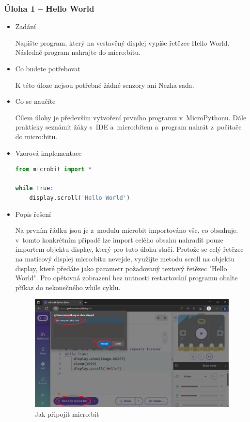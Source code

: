 \documentclass[
  digital,     %
  oneside,     %
  nosansbold,  %
  colorbold, %
  lof,         %
  nolot,         %
]{fithesis4}
\begin{document}
\subsubsection{Úloha 1 -- Hello World}
\begin{itemize}
    \item Zadání

Napište program, který na vestavěný displej vypíše řetězec Hello World. Následně program nahrajte do micro:bitu.
    \item Co budete potřebovat

K této úloze nejsou potřebné žádné senzory ani Nezha sada.
    \item Co se naučíte

Cílem úlohy je především vytvoření prvního programu v~MicroPythonu. Dále prakticky seznámit žáky s~IDE a~micro:bitem a~program nahrát z~počítače do micro:bitu.
    \item Vzorová implementace
\begin{footnotesize}
\begin{lstlisting}[language=Python, caption=Úloha 1 - Hello World]
from microbit import *

while True:
    display.scroll('Hello World')
\end{lstlisting}
\end{footnotesize}
    \item Popis řešení

Na prvním řádku jsou je z~modulu microbit importováno vše, co obsahuje. v~tomto konkrétním případě lze import celého obsahu nahradit pouze importem objektu display, který pro tuto úlohu stačí. Protože se celý řetězec na maticový displej micro:bitu nevejde, využijte metodu scroll na objektu display, které předáte jako parametr požadovaný textový řetězec "Hello World". Pro opětovná zobrazení bez nutnosti restartování programu obalte příkaz do nekonečného while cyklu.

\begin{figure}[ht]
    \centering
    \includegraphics[width=\textwidth]  {images/send1.png}
    \caption{Jak připojit micro:bit}
\end{figure}


\end{itemize}
\end{document}
